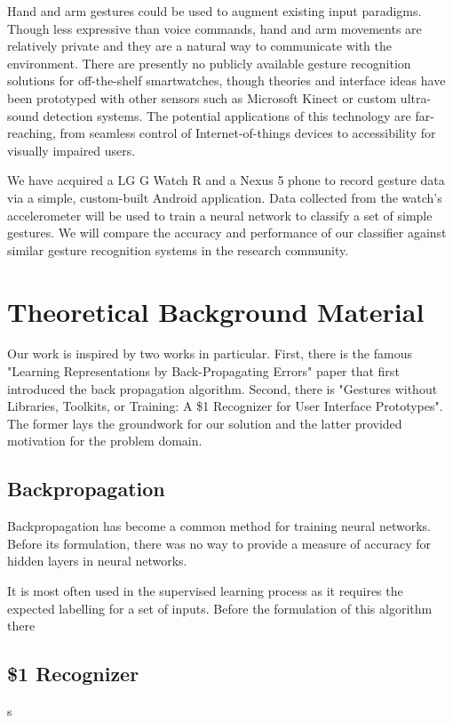 \documentclass{article}
\begin{document}
Hand and arm gestures could be used to augment existing input paradigms. Though less expressive than voice commands, hand and arm movements are relatively private and they are a natural way to communicate with the environment. There are presently no publicly available gesture recognition solutions for off-the-shelf smartwatches, though theories and interface ideas have been prototyped with other sensors such as Microsoft Kinect or custom ultra-sound detection systems. The potential applications of this technology are far-reaching, from seamless control of Internet-of-things devices to accessibility for visually impaired users.

We have acquired a LG G Watch R and a Nexus 5 phone to record gesture data via a simple, custom-built Android application. Data collected from the watch's accelerometer will be used to train a neural network to classify a set of simple gestures. We will compare the accuracy and performance of our classifier against similar gesture recognition systems in the research community.

\section{Theoretical Background Material}
Our work is inspired by two works in particular. First, there is the famous "Learning Representations by Back-Propagating Errors" paper that first introduced the back propagation algorithm. Second, there is "Gestures without Libraries, Toolkits, or Training: A \$1 Recognizer for User Interface Prototypes". The former lays the groundwork for our solution and the latter provided motivation for the problem domain. 

\subsection{Backpropagation}
Backpropagation has become a common method for training neural networks. Before its formulation,  there was no way to provide a measure of accuracy for hidden layers in neural networks. 

It is most often used in the supervised learning process as it requires the expected labelling for a set of inputs.  Before the formulation of this algorithm there

\subsection{\$1 Recognizer}s
\end{document}
